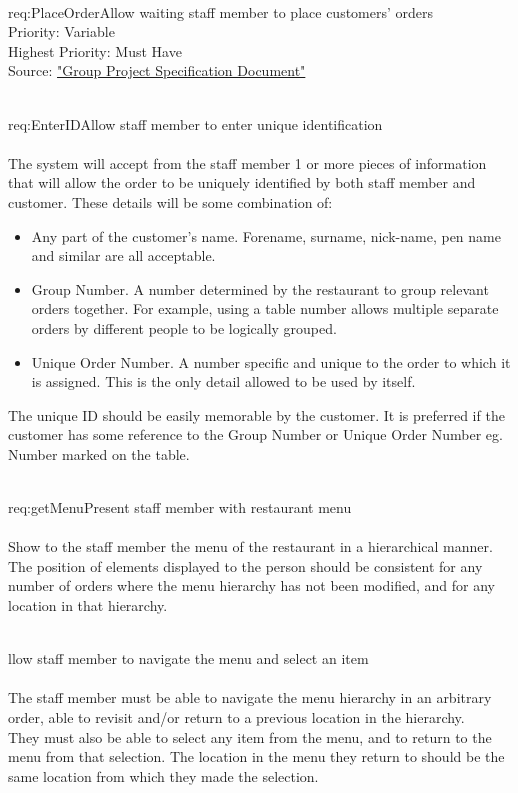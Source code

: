 \documentclass[11pt, a4paper]{report}
\def\itempar#1\\{\item \textbf{#1}\\} %
\begin{document}
\begin{enumerate}[label=F-UR-\arabic*, series=functional]

\itempar \label{req:PlaceOrder}Allow waiting staff member to place customers' orders\\
Priority: Variable\\
Highest Priority: Must Have\\
Source: \href{http://www.macs.hw.ac.uk/~rpp6/teaching/GroupProject/docs/project/GroupProjectSpec2017.pdf}{"Group Project Specification Document"}

\begin{enumerate}[label*=.\arabic*]
\itempar \label{req:EnterID}Allow staff member to enter unique identification\\
\underline{}\\
The system will accept from the staff member 1 or more pieces of information that will allow the order to be uniquely identified by both staff member and customer. These details will be some combination of:
\begin{itemize}
\item Any part of the customer's name. Forename, surname, nick-name, pen name and similar are all acceptable.
\item Group Number. A number determined by the restaurant to group relevant orders together. For example, using a table number allows multiple separate orders by different people to be logically grouped.
\item Unique Order Number. A number specific and unique to the order to which it is assigned. This is the only detail allowed to be used by itself.
\end{itemize}
The unique ID should be easily memorable by the customer. It is preferred if the customer has some reference to the Group Number or Unique Order Number eg. Number marked on the table.

\itempar \label{req:getMenu}Present staff member with restaurant menu\\
\underline{}\\
Show to the staff member the menu of the restaurant in a hierarchical manner.\\
The position of elements displayed to the person should be consistent for any number of orders where the menu hierarchy has not been modified, and for any location in that hierarchy.

\itempar Allow staff member to navigate the menu and select an item\\
\underline{}\\
The staff member must be able to navigate the menu hierarchy in an arbitrary order, able to revisit and/or return to a previous location in the hierarchy.\\
They must also be able to select any item from the menu, and to return to the menu from that selection. The location in the menu they return to should be the same location from which they made the selection.


\end{enumerate}
\end{enumerate}
\end{document}
